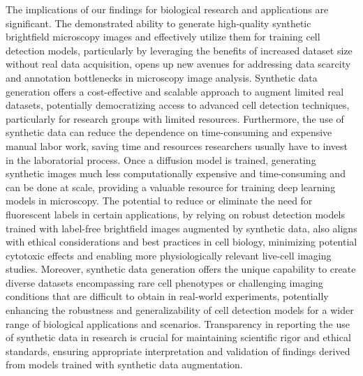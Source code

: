 The implications of our findings for biological research and applications are significant.
The demonstrated ability to generate high-quality synthetic brightfield microscopy images and effectively utilize them for training cell detection models, particularly by leveraging the benefits of increased dataset size without real data acquisition, opens up new avenues for addressing data scarcity and annotation bottlenecks in microscopy image analysis.
Synthetic data generation offers a cost-effective and scalable approach to augment limited real datasets, potentially democratizing access to advanced cell detection techniques, particularly for research groups with limited resources.
Furthermore, the use of synthetic data can reduce the dependence on time-consuming and expensive manual labor work, saving time and resources researchers usually have to invest in the laboratorial process.
Once a diffusion model is trained, generating synthetic images much less computationally expensive and time-consuming and can be done at scale, providing a valuable resource for training deep learning models in microscopy.
The potential to reduce or eliminate the need for fluorescent labels in certain applications, by relying on robust detection models trained with label-free brightfield images augmented by synthetic data, also aligns with ethical considerations and best practices in cell biology, minimizing potential cytotoxic effects and enabling more physiologically relevant live-cell imaging studies.
Moreover, synthetic data generation offers the unique capability to create diverse datasets encompassing rare cell phenotypes or challenging imaging conditions that are difficult to obtain in real-world experiments, potentially enhancing the robustness and generalizability of cell detection models for a wider range of biological applications and scenarios.
Transparency in reporting the use of synthetic data in research is crucial for maintaining scientific rigor and ethical standards, ensuring appropriate interpretation and validation of findings derived from models trained with synthetic data augmentation.